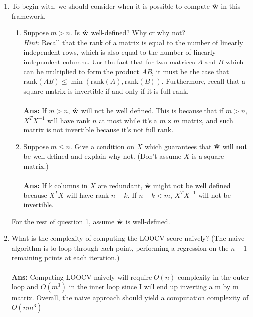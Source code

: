 \begin{enumerate}

\item To begin with, we should consider when it is possible to compute $\hat{\mathbf{w}}$ in this framework.
	\begin{enumerate}
	\item Suppose $m > n$. Is $\hat{\mathbf{w}}$ well-defined? Why or why not?\\
	\emph{Hint:} Recall that the rank of a matrix is equal to the number of linearly independent rows, which is also equal to the number of linearly independent columns. Use the fact that for two matrices $A$ and $B$ which can be multiplied to form the product $AB$, it must be the case that $\text{rank}(AB) \le \min \left( \text{rank}(A), \text{rank}(B) \right)$. Furthermore, recall that a square matrix is invertible if and only if it is full-rank.\\
	\\
	
	{\bf Ans: }If $m>n$, $\hat{\mathbf{w}}$ will not be well defined. This is because that if $m>n$, $X^TX^{-1}$ will have rank $n$ at most while it's a $m \times m$ matrix, and such matrix is not invertible because it's not full rank. \\
	
	\item Suppose $m \le n$. Give a condition on $X$ which guarantees that $\hat{\mathbf{w}}$ will \textbf{not} be well-defined and explain why not. (Don't assume $X$ is a square matrix.)\\
	\\
	{\bf Ans: } If k columns in $X$ are redundant, $\hat{\mathbf{w}}$ might not be well defined because $X^TX$ will have rank $n-k$. If $n-k < m$, $X^TX^{-1}$ will not be invertible. \\
	
	\end{enumerate}
For the rest of question 1, assume $\hat{\mathbf{w}}$ is well-defined.

\item  What is the complexity of computing the LOOCV score
  naively? (The naive algorithm is to loop through each point,
  performing a regression on the $n-1$ remaining points at each
  iteration.)\\
  \\
  {\bf Ans: } Computing LOOCV naively will require $O(n)$ complexity in the outer loop and $O(m^3)$ in the inner loop since I will end up inverting a m by m matrix. Overall, the naive approach should yield a computation complexity of $O(nm^3)$
  \\


\end{enumerate}
